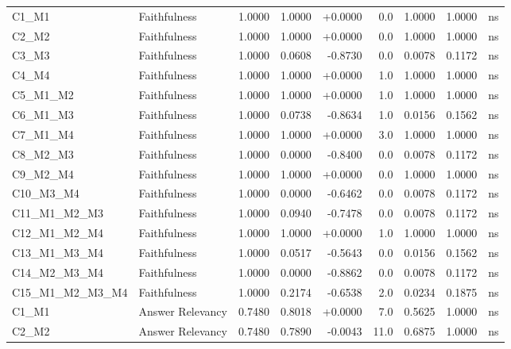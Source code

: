 \begin{table}[p]
\begin{tabular*}{\textwidth}{@{\extracolsep{\fill}} l l r r r r r r c @{}}
\addlinespace
C1\_M1          & Faithfulness         & 1.0000 & 1.0000 & +0.0000 & 0.0 & 1.0000 & 1.0000 & ns \\
\addlinespace
C2\_M2          & Faithfulness         & 1.0000 & 1.0000 & +0.0000 & 0.0 & 1.0000 & 1.0000 & ns \\
\addlinespace
C3\_M3          & Faithfulness         & 1.0000 & 0.0608 & -0.8730 & 0.0 & 0.0078 & 0.1172 & ns \\
\addlinespace
C4\_M4          & Faithfulness         & 1.0000 & 1.0000 & +0.0000 & 1.0 & 1.0000 & 1.0000 & ns \\
\addlinespace
C5\_M1\_M2      & Faithfulness         & 1.0000 & 1.0000 & +0.0000 & 1.0 & 1.0000 & 1.0000 & ns \\
\addlinespace
C6\_M1\_M3      & Faithfulness         & 1.0000 & 0.0738 & -0.8634 & 1.0 & 0.0156 & 0.1562 & ns \\
\addlinespace
C7\_M1\_M4      & Faithfulness         & 1.0000 & 1.0000 & +0.0000 & 3.0 & 1.0000 & 1.0000 & ns \\
\addlinespace
C8\_M2\_M3      & Faithfulness         & 1.0000 & 0.0000 & -0.8400 & 0.0 & 0.0078 & 0.1172 & ns \\
\addlinespace
C9\_M2\_M4      & Faithfulness         & 1.0000 & 1.0000 & +0.0000 & 0.0 & 1.0000 & 1.0000 & ns \\
\addlinespace
C10\_M3\_M4     & Faithfulness         & 1.0000 & 0.0000 & -0.6462 & 0.0 & 0.0078 & 0.1172 & ns \\
\addlinespace
C11\_M1\_M2\_M3 & Faithfulness         & 1.0000 & 0.0940 & -0.7478 & 0.0 & 0.0078 & 0.1172 & ns \\
\addlinespace
C12\_M1\_M2\_M4 & Faithfulness         & 1.0000 & 1.0000 & +0.0000 & 1.0 & 1.0000 & 1.0000 & ns \\
\addlinespace
C13\_M1\_M3\_M4 & Faithfulness         & 1.0000 & 0.0517 & -0.5643 & 0.0 & 0.0156 & 0.1562 & ns \\
\addlinespace
C14\_M2\_M3\_M4 & Faithfulness         & 1.0000 & 0.0000 & -0.8862 & 0.0 & 0.0078 & 0.1172 & ns \\
\addlinespace
C15\_M1\_M2\_M3\_M4 & Faithfulness         & 1.0000 & 0.2174 & -0.6538 & 2.0 & 0.0234 & 0.1875 & ns \\
\addlinespace
C1\_M1          & Answer Relevancy     & 0.7480 & 0.8018 & +0.0000 & 7.0 & 0.5625 & 1.0000 & ns \\
\addlinespace
C2\_M2          & Answer Relevancy     & 0.7480 & 0.7890 & -0.0043 & 11.0 & 0.6875 & 1.0000 & ns \\

\end{tabular*}
\end{table}
